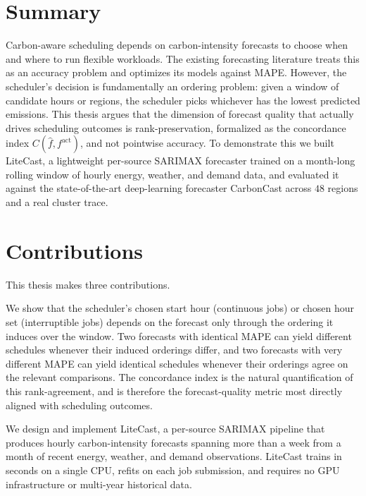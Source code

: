 
\section{Summary}
\label{sec:conclusion-summary}

Carbon-aware scheduling depends on carbon-intensity forecasts to choose when and where to run flexible workloads.
The existing forecasting literature treats this as an accuracy problem and optimizes its models against MAPE. However, the scheduler's decision is fundamentally an ordering problem: given a window of candidate hours or regions, the scheduler picks whichever has the lowest predicted emissions.
This thesis argues that the dimension of forecast quality that actually drives scheduling outcomes is rank-preservation, formalized as the concordance index $C(\hat{f}, f^{\text{act}})$, and not pointwise accuracy.
To demonstrate this we built LiteCast, a lightweight per-source SARIMAX forecaster trained on a month-long rolling window of hourly energy, weather, and demand data, and evaluated it against the state-of-the-art deep-learning forecaster CarbonCast across $48$ regions and a real cluster trace.

\section{Contributions}
\label{sec:conclusion-contributions}

This thesis makes three contributions.

We show that the scheduler's chosen start hour (continuous jobs) or chosen hour set (interruptible jobs) depends on the forecast only through the ordering it induces over the window.
Two forecasts with identical MAPE can yield different schedules whenever their induced orderings differ, and two forecasts with very different MAPE can yield identical schedules whenever their orderings agree on the relevant comparisons.
The concordance index is the natural quantification of this rank-agreement, and is therefore the forecast-quality metric most directly aligned with scheduling outcomes.

We design and implement LiteCast, a per-source SARIMAX pipeline that produces hourly carbon-intensity forecasts spanning more than a week from a month of recent energy, weather, and demand observations.
LiteCast trains in seconds on a single CPU, refits on each job submission, and requires no GPU infrastructure or multi-year historical data.

